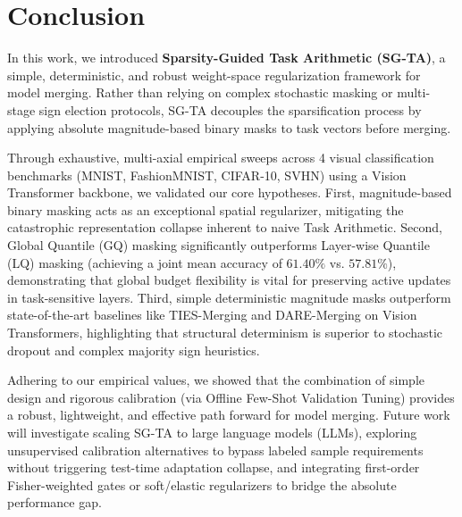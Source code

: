 \section{Conclusion}
\label{sec:conclusion}

In this work, we introduced \textbf{Sparsity-Guided Task Arithmetic (SG-TA)}, a simple, deterministic, and robust weight-space regularization framework for model merging. Rather than relying on complex stochastic masking or multi-stage sign election protocols, SG-TA decouples the sparsification process by applying absolute magnitude-based binary masks to task vectors before merging. 

Through exhaustive, multi-axial empirical sweeps across 4 visual classification benchmarks (MNIST, FashionMNIST, CIFAR-10, SVHN) using a Vision Transformer backbone, we validated our core hypotheses. First, magnitude-based binary masking acts as an exceptional spatial regularizer, mitigating the catastrophic representation collapse inherent to naive Task Arithmetic. Second, Global Quantile (GQ) masking significantly outperforms Layer-wise Quantile (LQ) masking (achieving a joint mean accuracy of $61.40\%$ vs. $57.81\%$), demonstrating that global budget flexibility is vital for preserving active updates in task-sensitive layers. Third, simple deterministic magnitude masks outperform state-of-the-art baselines like TIES-Merging and DARE-Merging on Vision Transformers, highlighting that structural determinism is superior to stochastic dropout and complex majority sign heuristics.

Adhering to our empirical values, we showed that the combination of simple design and rigorous calibration (via Offline Few-Shot Validation Tuning) provides a robust, lightweight, and effective path forward for model merging. Future work will investigate scaling SG-TA to large language models (LLMs), exploring unsupervised calibration alternatives to bypass labeled sample requirements without triggering test-time adaptation collapse, and integrating first-order Fisher-weighted gates or soft/elastic regularizers to bridge the absolute performance gap.
